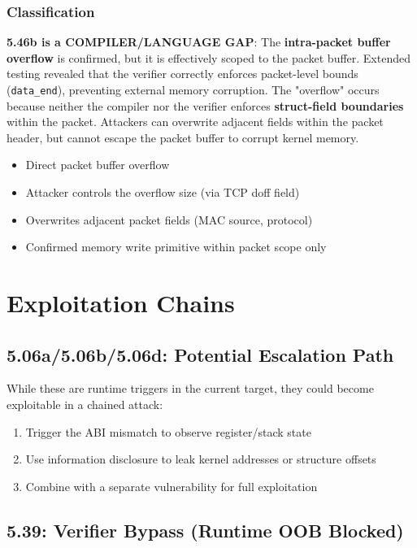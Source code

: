 \subsubsection{Classification}

\textbf{5.46b is a COMPILER/LANGUAGE GAP}: The \textbf{intra-packet buffer overflow} is confirmed, but it is effectively scoped to the packet buffer. Extended testing revealed that the verifier correctly enforces packet-level bounds (\texttt{data\_end}), preventing external memory corruption. The "overflow" occurs because neither the compiler nor the verifier enforces \textbf{struct-field boundaries} within the packet. Attackers can overwrite adjacent fields within the packet header, but cannot escape the packet buffer to corrupt kernel memory.
\begin{itemize}
  \item Direct packet buffer overflow
  \item Attacker controls the overflow size (via TCP doff field)
  \item Overwrites adjacent packet fields (MAC source, protocol)
  \item Confirmed memory write primitive within packet scope only
\end{itemize}


\section{Exploitation Chains}

\subsection{5.06a/5.06b/5.06d: Potential Escalation Path}

While these are runtime triggers in the current target, they could become exploitable in a chained attack:
\begin{enumerate}[label=\arabic*.]
  \item Trigger the ABI mismatch to observe register/stack state
  \item Use information disclosure to leak kernel addresses or structure offsets
  \item Combine with a separate vulnerability for full exploitation
\end{enumerate}

\subsection{5.39: Verifier Bypass (Runtime OOB Blocked)}

